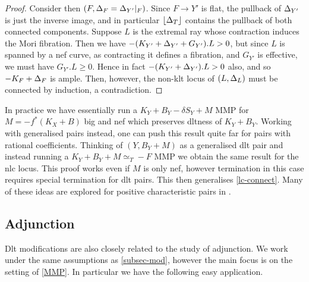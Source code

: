 \begin{proof}
	Consider then $(F,\Delta_{F}=\Delta_{Y'}|_{F})$. Since $F \to Y'$ is flat, the pullback of $\Delta_{Y'}$ is just the inverse image, and in particular $\lfloor \Delta_{T} \rfloor$ contains the pullback of both connected components. Suppose $L$ is the extremal ray whose contraction induces the Mori fibration. Then we have $-(K_{Y'}+\Delta_{Y'}+G_{Y'}).L >0$, but since $L$ is spanned by a nef curve, as contracting it defines a fibration, and $G_{Y'}$ is effective, we must have $G_{Y'}.L \geq 0$. Hence in fact $-(K_{Y'}+\Delta_{Y'}).L >0$ also, and so $-K_{F}+\Delta_{F}$ is ample. Then, however, the non-klt locus of $(L,\Delta_{L})$ must be connected by induction, a contradiction.

\end{proof}


In practice we have essentially run a $K_{Y}+B_{Y}-\delta S_{Y}+ M$ MMP for $M=-f^{*}(K_{X}+B)$ big and nef which preserves dltness of $K_{Y}+B_{Y}$. Working with generalised pairs instead, one can push this result quite far for pairs with rational coefficients. Thinking of $(Y,B_{Y}+M)$ as a generalised dlt pair and instead running a $K_{Y}+B_{Y}+M\simeq_{T} -F$ MMP we obtain the same result for the nlc locus. This proof works even if $M$ is only nef, however termination in this case requires special termination for dlt pairs. This then generalises \autoref{lc-connect}.  Many of these ideas are explored for positive characteristic pairs in \cite{filipazzi2020connectedness}.




\subsection{Adjunction}


Dlt modifications are also closely related to the study of adjunction. We work under the same assumptions as \autoref{subsec-mod}, however the main focus is on the setting of \autoref{MMP}. 
In particular we have the following easy application.

